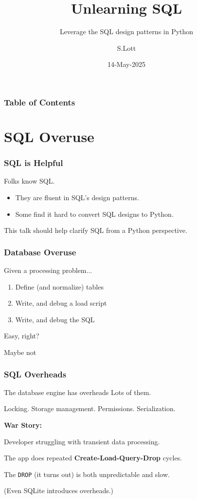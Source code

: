 \documentclass{beamer}
\title{Unlearning SQL}
\subtitle{Leverage the SQL design patterns in Python}
\author{S.Lott}
\institute{\texttt{\underline{https://fosstodon.org/@slott56}}\linebreak{}\texttt{\underline{https://github.com/slott56}}}
\date{14-May-2025}
\begin{document}
\frame{
    \titlepage
}

\begin{frame}
\frametitle{Table of Contents}
\tableofcontents
\end{frame}

\section{SQL Overuse}

\begin{frame}
    \frametitle{SQL is Helpful}

    Folks know SQL.

    \vspace{1em}
    \begin{itemize}

    \item They are fluent in SQL's design patterns.

    \item Some find it hard to convert SQL designs to Python.
    \end{itemize}

    \vspace{1em}
    This talk should help clarify SQL from a Python perspective.
\end{frame}

\begin{frame}
    \frametitle{Database Overuse}

    Given a processing problem...\pause

    \begin{enumerate}
        \item Define (and normalize) tables
        \item Write, and debug a load script
        \item Write, and debug the SQL
    \end{enumerate}

    Easy, right? \pause

    \vspace{1em}
    Maybe not
\end{frame}

\begin{frame}
    \frametitle{SQL Overheads}

    \begin{block}{The database engine has overheads}
        Lots of them.

        Locking. Storage management. Permissions. Serialization.
    \end{block}

    \textbf{War Story:}

    Developer struggling with transient data processing.

    The app does repeated \textbf{Create-Load-Query-Drop} cycles.

    The \texttt{DROP} (it turns out) is both unpredictable and slow.

    \vspace{1em}
    (Even SQLite introduces overheads.)
\end{frame}
\end{document}
